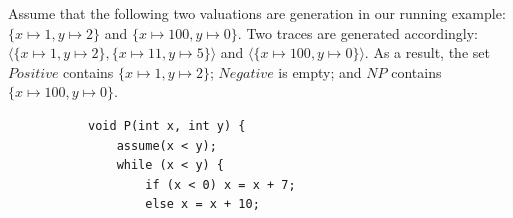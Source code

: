 Assume that the following two valuations are generation in our running example: $\{x \mapsto 1, y \mapsto 2\}$ and $\{x \mapsto 100, y \mapsto 0\}$. Two traces are generated accordingly: $\langle \{x \mapsto 1, y \mapsto 2\}, \{x \mapsto 11, y \mapsto 5\} \rangle$ and $\langle \{x \mapsto 100, y \mapsto 0\} \rangle$. As a result, the set $Positive$ contains $\{x \mapsto 1, y \mapsto 2\}$; $Negative$ is empty; and $NP$ contains $\{x \mapsto 100, y \mapsto 0\}$. 

\begin{figure}[t]
\begin{subfigure}{0.5\textwidth}
    \raggedright
    \vspace{0.5cm}
{\scriptsize\begin{verbatim}
void P(int x, int y) {
    assume(x < y);
    while (x < y) {
        if (x < 0) x = x + 7;
        else x = x + 10;


\end{verbatim}}
\end{subfigure}
\end{figure}
